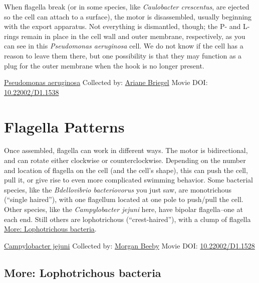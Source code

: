\documentclass[]{tufte-book}
\begin{document}
When flagella break (or in some species, like \emph{Caulobacter crescentus}, are ejected so the cell can attach to a surface), the motor is disassembled, usually beginning with the export apparatus. Not everything is dismantled, though; the P- and L-rings remain in place in the cell wall and outer membrane, respectively, as you can see in this \emph{Pseudomonas aeruginosa} cell. We do not know if the cell has a reason to leave them there, but one possibility is that they may function as a plug for the outer membrane when the hook is no longer present.



\hypertarget{htmlwidget-738497aece62ef57e521}{}

\label{fig:6-3a}\protect\hyperlink{tree}{Pseudomonas aeruginosa} Collected by: \protect\hyperlink{ariane_briegel}{Ariane Briegel} Movie DOI: \href{https://doi.org/10.22002/D1.1538}{10.22002/D1.1538}

\hypertarget{flagella-patterns}{%
\section{Flagella Patterns}\label{flagella-patterns}}

Once assembled, flagella can work in different ways. The motor is bidirectional, and can rotate either clockwise or counterclockwise. Depending on the number and location of flagella on the cell (and the cell's shape), this can push the cell, pull it, or give rise to even more complicated swimming behavior. Some bacterial species, like the \emph{Bdellovibrio bacteriovorus} you just saw, are monotrichous (``single haired''), with one flagellum located at one pole to push/pull the cell. Other species, like the \emph{Campylobacter jejuni} here, have bipolar flagella--one at each end. Still others are lophotrichous (``crest-haired''), with a clump of flagella \protect\hyperlink{Lophotrichous_bacteria}{More: Lophotrichous bacteria}.



\hypertarget{htmlwidget-caa3dff2d8693fce36ec}{}

\label{fig:6-4}\protect\hyperlink{tree}{Campylobacter jejuni} Collected by: \protect\hyperlink{morgan_beeby}{Morgan Beeby} Movie DOI: \href{https://doi.org/10.22002/D1.1528}{10.22002/D1.1528}

\hypertarget{Lophotrichous_bacteria}{%
\subsection*{More: Lophotrichous bacteria}\label{Lophotrichous_bacteria}}
\end{document}
